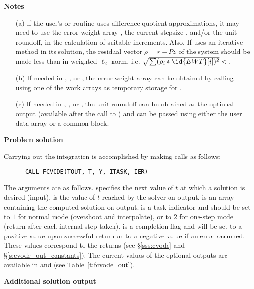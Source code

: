 \begin{Steps}
  {\bf Notes} 
  \begin{itemize}
  \item[(a) ] If the user's  or  routine uses difference
    quotient approximations, it may need to use the error weight array ,
    the current stepsize , and/or the unit roundoff, in the calculation of
    suitable increments.  Also, If  uses an iterative method in its
    solution, the residual vector $\rho = r - Pz$ of the system should be made
    less than  in weighted $\ell_2$ norm, i.e.
    $\sqrt{\sum(\rho_i * \id{EWT}[i])^2} < $ .
  \item[(b) ] If needed in , , or , the
    error weight array  can be obtained by calling 
    using one of the work arrays as temporary storage for .
  \item[(c) ] If needed in , , or , the
    unit roundoff can be obtained as the optional output 
    (available after the call to ) and can be passed
    using either the  user data array or a common block.
  \end{itemize}

\item {\bf Problem solution}

  Carrying out the integration is accomplished by making calls as follows:
\begin{verbatim}
      CALL FCVODE(TOUT, T, Y, ITASK, IER)
\end{verbatim}
  The arguments are as follows.
   specifies the next value of $t$ at which a solution is desired (input).
   is the value of $t$ reached by the solver on output.
   is an array containing the computed solution on output.
   is a task indicator and should be set to $1$ for normal mode 
  (overshoot  and interpolate), or to $2$ for one-step mode 
  (return after each internal step taken).
   is a completion flag and will be set to a positive value upon
  successful return or to a negative value if an error occurred. These values
  correspond to the  returns (see \S\ref{sss:cvode} and \S\ref{s:cvode_out_constants}).
  The current values of the optional outputs are available in  and
   (see Table~\ref{t:fcvode_out}).
  
\item {\bf Additional solution output}


\end{Steps}
